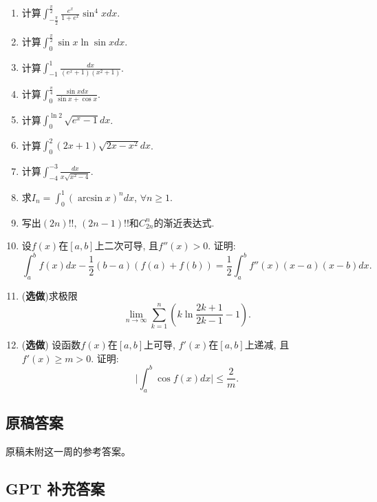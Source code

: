 \documentclass[UTF8,11pt, a4paper, oneside, fontset=none]{ctexbook}
\begin{document}
\begin{enumerate}

\item 计算$\int_{- \frac{\pi}{2}}^{\frac{\pi}{2}} \frac{e^x}{1 + e^x} \sin^4 x dx$.

\item 计算$\int_0^{\frac{\pi}{2}} \sin x \ln \sin x dx$.

\item 计算$\int_{-1}^1 \frac{dx}{(e^x+1)(x^2 + 1)}$.

\item 计算$\int_0^{\frac{\pi}{4}} \frac{\sin x dx}{\sin x + \cos x}$.

\item 计算$\int_0^{\ln 2} \sqrt{e^x -1} dx$. 

\item 计算$\int_0^2 (2x+1) \sqrt{2x -x^2} dx$. 

\item 计算$\int_{-4}^{-3} \frac{dx}{x \sqrt{x^2 -4}}$. 

\item 求$I_n = \int_0^1 (\arcsin x)^n dx$, $\forall n \geq 1$.

\item 写出$(2n)!!$, $(2n-1)!!$和$C_{2n}^n$的渐近表达式.


\item 设$f(x)$在$[a, b]$上二次可导, 且$f''(x) > 0$. 证明:
\[
\int_a^b f(x) dx - \frac{1}{2} (b - a) (f(a) + f(b)) = \frac{1}{2} \int_a^b f''(x) (x - a)(x - b)dx.
\]

\item ({\bf 选做})求极限
\[
\lim_{n \to \infty} \sum_{k = 1}^n \left( k \ln \frac{2k+1}{2k-1} -1 \right).
\]

\item ({\bf 选做}) 设函数$f(x)$在$[a, b]$上可导, $f'(x)$在$[a, b]$上递减, 且$f'(x) \geq m >0$. 证明:
\[
\Big| \int_a^b \cos f(x) dx \Big| \leq \frac{2}{m}.
\]

\end{enumerate}

\clearpage

\subsection*{原稿答案}

\noindent 原稿未附这一周的参考答案。

\clearpage

\subsection*{GPT 补充答案}
\end{document}
